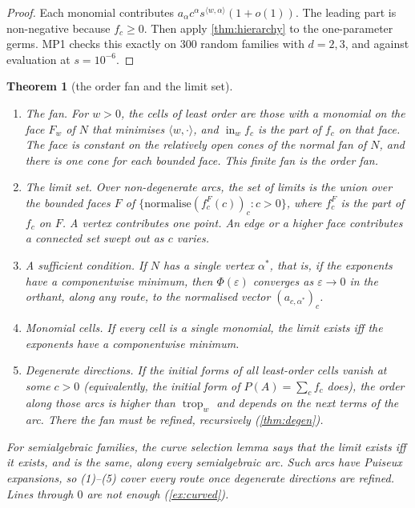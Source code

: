 \documentclass[11pt]{article}
\newtheorem{theorem}{Theorem}\newtheorem{proposition}[theorem]{Proposition}\newtheorem{lemma}[theorem]{Lemma}\newtheorem{corollary}[theorem]{Corollary}\newtheorem{conjecture}[theorem]{Conjecture}
\theoremstyle{definition}\newtheorem{definition}[theorem]{Definition}\newtheorem{remark}[theorem]{Remark}\newtheorem{example}[theorem]{Example}
\begin{document}
\begin{proof}
Each monomial contributes $a_\alpha c^\alpha s^{\langle w,\alpha\rangle}(1+o(1))$. The leading part is non-negative because $f_c\ge0$. Then apply
\cref{thm:hierarchy} to the one-parameter germs. MP1 checks this exactly on $300$ random families with $d=2,3$, and against evaluation at
$s=10^{-6}$.
\end{proof}

\begin{theorem}[the order fan and the limit set]\label{thm:fan}
\begin{enumerate}
\item[(1)] \emph{The fan.} For $w>0$, the cells of least order are those with a monomial on the face $F_w$ of $N$ that minimises $\langle w,\cdot\rangle$,
  and $\operatorname{in}_wf_c$ is the part of $f_c$ on that face. The face is constant on the relatively open cones of the normal fan of $N$, and
  there is one cone for each bounded face. This finite fan is the \emph{order fan}.
\item[(2)] \emph{The limit set.} Over non-degenerate arcs, the set of limits is the union over the bounded faces $F$ of
  $\{\text{normalise}(f^F_c(c))_c:c>0\}$, where $f^F_c$ is the part of $f_c$ on $F$. A vertex contributes one point. An edge or a higher face
  contributes a connected set swept out as $c$ varies.
\item[(3)] \emph{A sufficient condition.} If $N$ has a single vertex $\alpha^*$, that is, if the exponents have a componentwise minimum, then
  $\Phi(\varepsilon)$ converges as $\varepsilon\to0$ in the orthant, along any route, to the normalised vector $(a_{c,\alpha^*})_c$.
\item[(4)] \emph{Monomial cells.} If every cell is a single monomial, the limit exists iff the exponents have a componentwise minimum.
\item[(5)] \emph{Degenerate directions.} If the initial forms of \emph{all} least-order cells vanish at some $c>0$ (equivalently, the initial form
  of $P(A)=\sum_cf_c$ does), the order along those arcs is higher than $\operatorname{trop}_w$ and depends on the next terms of the arc. There the fan
  must be refined, recursively (\cref{thm:degen}).
\end{enumerate}
For semialgebraic families, the curve selection lemma \cite{Milnor1968} says that the limit exists iff it exists, and is the same, along every
semialgebraic arc. Such arcs have Puiseux expansions, so (1)--(5) cover every route once degenerate directions are refined. Lines through
$0$ are not enough (\cref{ex:curved}).
\end{theorem}
\end{document}
